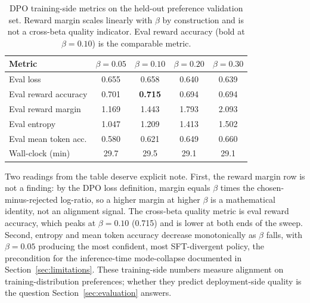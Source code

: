 \documentclass[../main.tex]{subfiles}
\begin{document}
\begin{table}[h]
\centering
\small
\begin{tabular}{lcccc}
\toprule
\textbf{Metric} & $\beta = 0.05$ & $\beta = 0.10$ & $\beta = 0.20$ & $\beta = 0.30$ \\
\midrule
Eval loss               & 0.655 & 0.658 & 0.640 & 0.639 \\
Eval reward accuracy    & 0.701 & \textbf{0.715} & 0.694 & 0.694 \\
Eval reward margin      & 1.169 & 1.443 & 1.793 & 2.093 \\
Eval entropy            & 1.047 & 1.209 & 1.413 & 1.502 \\
Eval mean token acc.    & 0.580 & 0.621 & 0.649 & 0.660 \\
Wall-clock (min)        & 29.7  & 29.5  & 29.1  & 29.1  \\
\bottomrule
\end{tabular}
\caption{DPO training-side metrics on the held-out preference validation set. Reward margin scales linearly with $\beta$ by construction and is not a cross-beta quality indicator. Eval reward accuracy (bold at $\beta = 0.10$) is the comparable metric.}
\label{tab:dpo_results}
\end{table}

Two readings from the table deserve explicit note. First, the reward margin row is not a finding: by the DPO loss definition, margin equals $\beta$ times the chosen-minus-rejected log-ratio, so a higher margin at higher $\beta$ is a mathematical identity, not an alignment signal. The cross-beta quality metric is eval reward accuracy, which peaks at $\beta = 0.10$ (0.715) and is lower at both ends of the sweep. Second, entropy and mean token accuracy decrease monotonically as $\beta$ falls, with $\beta = 0.05$ producing the most confident, most SFT-divergent policy, the precondition for the inference-time mode-collapse documented in Section~\ref{sec:limitations}. These training-side numbers measure alignment on training-distribution preferences; whether they predict deployment-side quality is the question Section~\ref{sec:evaluation} answers.
\end{document}
